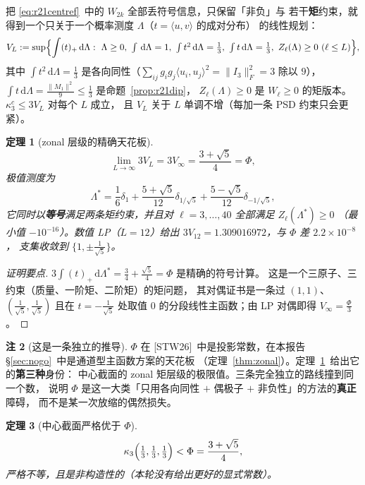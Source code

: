 \documentclass[UTF8,11pt]{ctexart}
\newtheorem{theorem}{定理}[section]
\theoremstyle{definition}
\newtheorem{remark}[theorem]{注}
\newcommand{\dd}{\,\mathrm{d}}
\newcommand{\STW}{\textup{[STW26]}}
\begin{document}
把 \eqref{eq:r21centref}~中的 $W_{2k}$ 全部丢符号信息，只保留「非负」与
若干\textbf{矩}约束，就得到一个只关于一个概率测度 $\Lambda$（$t=\langle u,v\rangle$ 的成对分布）
的线性规划：
\begin{equation}\label{eq:r21lp}
V_L:=\sup\Bigl\{\int(t)_+\dd\Lambda:\ \Lambda\ge0,\ \textstyle\int\dd\Lambda=1,\
\int t^2\dd\Lambda=\tfrac13,\ \int t\dd\Lambda=\tfrac13,\ Z_\ell(\Lambda)\ge0\ (\ell\le L)\Bigr\},
\end{equation}
其中 $\int t^2\dd\Lambda=\frac13$ 是各向同性（$\sum_{ij}g_ig_j\langle u_i,u_j\rangle^2=\|I_3\|_F^2=3$
除以 $9$），$\int t\dd\Lambda=\frac{\|M_1\|^2}9\le\frac13$ 是命题~\ref{prop:r21dip}，
$Z_\ell(\Lambda)\ge0$ 是 $W_\ell\ge0$ 的矩版本。$\kappa_3^c\le3V_L$ 对每个 $L$ 成立，
且 $V_L$ 关于 $L$ 单调不增（每加一条 PSD 约束只会更紧）。

\begin{theorem}[zonal 层级的精确天花板]\label{thm:r21zonal}
\[
\lim_{L\to\infty}3V_L=3V_\infty=\frac{3+\sqrt5}4=\Phi ,
\]
极值测度为
\begin{equation}\label{eq:r21lamstar}
\Lambda^*=\frac16\delta_1+\frac{5+\sqrt5}{12}\delta_{1/\sqrt5}+\frac{5-\sqrt5}{12}\delta_{-1/\sqrt5},
\end{equation}
它同时以\textbf{等号}满足两条矩约束，并且对 $\ell=3,\dots,40$ 全部满足 $Z_\ell(\Lambda^*)\ge0$
（最小值 $-10^{-16}$）。数值 LP（$L=12$）给出 $3V_{12}=1.309016972$，与 $\Phi$ 差 $2.2\times10^{-8}$，
支集收敛到 $\{1,\pm\frac1{\sqrt5}\}$。
\end{theorem}

\begin{proof}[证明要点]
$3\int(t)_+\dd\Lambda^*=\frac34+\frac{\sqrt5}4=\Phi$ 是精确的符号计算。
这是一个三原子、三约束（质量、一阶矩、二阶矩）的矩问题，
其对偶证书是一条过 $(1,1)$、$(\frac1{\sqrt5},\frac1{\sqrt5})$ 且在 $t=-\frac1{\sqrt5}$ 处取值 $0$
的分段线性主函数；由 LP 对偶即得 $V_\infty=\frac\Phi3$。
\end{proof}

\begin{remark}[这是一条独立的推导]\label{rem:r21indep}
$\Phi$ 在 \STW~中是投影常数，在本报告 \S\ref{sec:nogo}~中是通道型主函数方案的天花板
（定理~\ref{thm:zonal}）。定理~\ref{thm:r21zonal}~给出它的\textbf{第三种}身份：
中心截面的 zonal 矩层级的极限值。三条完全独立的路线撞到同一个数，
说明 $\Phi$ 是这一大类「只用各向同性 $+$ 偶极子 $+$ 非负性」的方法的\textbf{真正}障碍，
而不是某一次放缩的偶然损失。
\end{remark}

\begin{theorem}[中心截面严格优于 $\Phi$]\label{thm:r21strict}
\begin{equation}\label{eq:r21strict}
\kappa_3\Bigl(\tfrac13,\tfrac13,\tfrac13\Bigr)<\Phi=\frac{3+\sqrt5}4 ,
\end{equation}
严格不等，且是非构造性的（本轮没有给出更好的显式常数）。
\end{theorem}
\end{document}
